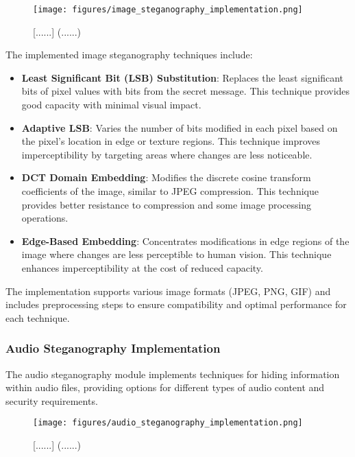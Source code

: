 \documentclass[12pt, a4paper, oneside]{book}
\begin{document}
\begin{figure}[htbp]
    \centering
    \texttt{[image: figures/image\_steganography\_implementation.png]}
    \caption{[......] (......)}
    \label{fig:image_steg_implementation}
\end{figure}

The implemented image steganography techniques include:

\begin{itemize}[leftmargin=*]
    \item \textbf{Least Significant Bit (LSB) Substitution}: Replaces the least significant bits of pixel values with bits from the secret message. This technique provides good capacity with minimal visual impact.

    \item \textbf{Adaptive LSB}: Varies the number of bits modified in each pixel based on the pixel's location in edge or texture regions. This technique improves imperceptibility by targeting areas where changes are less noticeable.

    \item \textbf{DCT Domain Embedding}: Modifies the discrete cosine transform coefficients of the image, similar to JPEG compression. This technique provides better resistance to compression and some image processing operations.

    \item \textbf{Edge-Based Embedding}: Concentrates modifications in edge regions of the image where changes are less perceptible to human vision. This technique enhances imperceptibility at the cost of reduced capacity.
\end{itemize}

The implementation supports various image formats (JPEG, PNG, GIF) and includes preprocessing steps to ensure compatibility and optimal performance for each technique.

\subsubsection{Audio Steganography Implementation}

The audio steganography module implements techniques for hiding information within audio files, providing options for different types of audio content and security requirements.

\begin{figure}[htbp]
    \centering
    \texttt{[image: figures/audio\_steganography\_implementation.png]}
    \caption{[......] (......)}
    \label{fig:audio_steg_implementation}
\end{figure}
\end{document}
